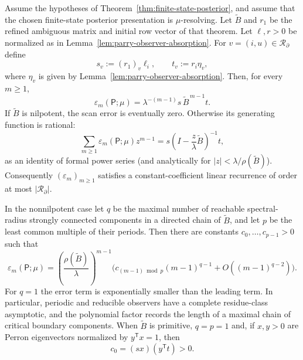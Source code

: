 \begin{theorem}
\label{thm:exact-parry-scan-law}
Assume the hypotheses of Theorem~\ref{thm:finite-state-posterior}, and assume
that the chosen finite-state posterior presentation is $\mu$-resolving.  Let
$\widetilde B$ and $r_1$ be the refined ambiguous matrix and initial row vector
of that theorem.  Let $\ell,r>0$ be normalized as in
Lemma~\ref{lem:parry-observer-absorption}.  For $v=(i,u)\in\mathcal R_\partial$
define
\[
s_v:=(r_1)_v\ell_i,
\qquad
t_v:=r_i\eta_v,
\]
where $\eta_v$ is given by Lemma~\ref{lem:parry-observer-absorption}.  Then,
for every $m\ge1$,
\begin{equation}
\label{eq:exact-parry-scan-law}
\varepsilon_m(\mathsf P;\mu)
=\lambda^{-(m-1)}s\,\widetilde B^{\,m-1}t.
\end{equation}
If $\widetilde B$ is nilpotent, the scan error is eventually zero.  Otherwise
its generating function is rational:
\[
\sum_{m\ge1}\varepsilon_m(\mathsf P;\mu)z^{m-1}
=s\left(I-\frac z\lambda\widetilde B\right)^{-1}t,
\]
as an identity of formal power series (and analytically for
$|z|<\lambda/\rho(\widetilde B)$).  Consequently
$(\varepsilon_m)_{m\ge1}$ satisfies a constant-coefficient linear recurrence
of order at most $|\mathcal R_\partial|$.

In the nonnilpotent case let $q$ be the maximal number of reachable
spectral-radius strongly connected components in a directed chain of
$\widetilde B$, and let $p$ be the least common multiple of their periods.
Then there are constants $c_0,\ldots,c_{p-1}>0$ such that
\[
\varepsilon_m(\mathsf P;\mu)
=\left(\frac{\rho(\widetilde B)}\lambda\right)^{m-1}
\bigl(c_{(m-1)\bmod p}(m-1)^{q-1}
 +O((m-1)^{q-2})\bigr).
\]
For $q=1$ the error term is exponentially smaller than the leading term.
In particular, periodic and reducible observers have a complete residue-class
asymptotic, and the polynomial factor records the length of a maximal chain of
critical boundary components.  When $\widetilde B$ is primitive, $q=p=1$ and,
if $x,y>0$ are Perron eigenvectors normalized by $y^{\mathsf T}x=1$, then
\[
c_0=(s x)(y^{\mathsf T}t)>0.
\]
\end{theorem}

